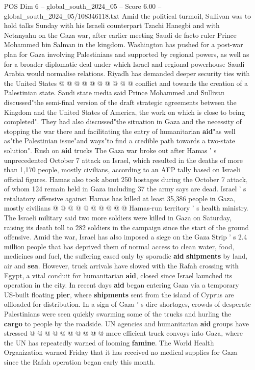 \begin{textsample}{POS Dim 6 – global\_south\_2024\_05 – Score 6.00 – global\_south\_2024\_05/108346118.txt}
Amid the political turmoil, Sullivan was to hold talks Sunday with his Israeli counterpart Tzachi Hanegbi and with Netanyahu on the Gaza war, after earlier meeting Saudi de facto ruler Prince Mohammed bin Salman in the kingdom.
Washington has pushed for a post-war plan for Gaza involving Palestinians and supported by regional powers, as well as for a broader diplomatic deal under which Israel and regional powerhouse Saudi Arabia would normalise relations.
Riyadh has demanded deeper security ties with the United States @ @ @ @ @ @ @ @ @ @ conflict and towards the creation of a Palestinian state.
Saudi state media said Prince Mohammed and Sullivan discussed"the semi-final version of the draft strategic agreements between the Kingdom and the United States of America, the work on which is close to being completed".
They had also discussed"the situation in Gaza and the necessity of stopping the war there and facilitating the entry of humanitarian \textbf{aid}"as well as"the Palestinian issue"and ways"to find a credible path towards a two-state solution".
Rush on \textbf{aid} trucks The Gaza war broke out after Hamas ' s unprecedented October 7 attack on Israel, which resulted in the deaths of more than 1,170 people, mostly civilians, according to an AFP tally based on Israeli official figures.
Hamas also took about 250 hostages during the October 7 attack, of whom 124 remain held in Gaza including 37 the army says are dead.
Israel ' s retaliatory offensive against Hamas has killed at least 35,386 people in Gaza, mostly civilians @ @ @ @ @ @ @ @ @ @ Hamas-run territory ' s health ministry.
The Israeli military said two more soldiers were killed in Gaza on Saturday, raising its death toll to 282 soldiers in the campaign since the start of the ground offensive.
Amid the war, Israel has also imposed a siege on the Gaza Strip ' s 2.4 million people that has deprived them of normal access to clean water, food, medicines and fuel, the suffering eased only by sporadic \textbf{aid} \textbf{shipments} by land, air and \textbf{sea}.
However, truck arrivals have slowed with the Rafah crossing with Egypt, a vital conduit for humanitarian \textbf{aid}, closed since Israel launched its operation in the city.
In recent days \textbf{aid} began entering Gaza via a temporary US-built floating \textbf{pier}, where \textbf{shipments} sent from the island of Cyprus are offloaded for distribution.
In a sign of Gaza ' s dire shortages, crowds of desperate Palestinians were seen quickly swarming some of the trucks and hurling the \textbf{cargo} to people by the roadside.
UN agencies and humanitarian \textbf{aid} groups have stressed @ @ @ @ @ @ @ @ @ @ more efficient truck convoys into Gaza, where the UN has repeatedly warned of looming \textbf{famine}.
The World Health Organization warned Friday that it has received no medical supplies for Gaza since the Rafah operation began early this month.

\end{textsample}
